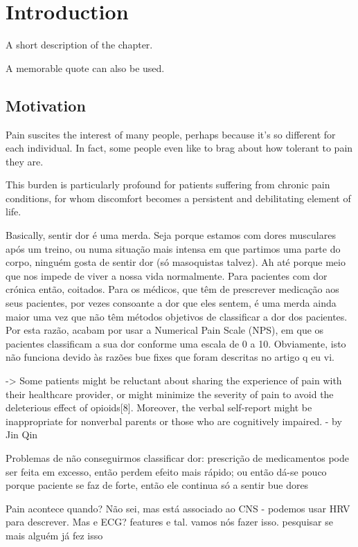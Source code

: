 \chapter{Introduction}%
\label{chapter:introduction}

\begin{introduction}
A short description of the chapter.

A memorable quote can also be used.
\end{introduction}


\section{Motivation}
Pain suscites the interest of many people, perhaps because it's so different for each individual. In fact, some people even like to brag about how tolerant to pain they are. 

This burden is particularly profound for patients suffering from chronic pain conditions, for whom discomfort becomes a persistent and debilitating element of life.

Basically, sentir dor é uma merda. Seja porque estamos com dores musculares após um treino, ou numa situação mais intensa em que partimos uma parte do corpo, ninguém gosta de sentir dor (só masoquistas talvez). Ah até porque meio que nos impede de viver a nossa vida normalmente. Para pacientes com dor crónica então, coitados. Para os médicos, que têm de prescrever medicação aos seus pacientes, por vezes consoante a dor que eles sentem, é uma merda ainda maior uma vez que não têm métodos objetivos de classificar a dor dos pacientes. Por esta razão, acabam por usar a Numerical Pain Scale (NPS), em que os pacientes classificam a sua dor conforme uma escala de 0 a 10. Obviamente, isto não funciona devido às razões bue fixes que foram descritas no artigo q eu vi.

-> Some patients might be reluctant about sharing the experience of pain with their healthcare provider, or might minimize the severity of pain to avoid the deleterious effect of opioids[8]. Moreover, the verbal self-report might be inappropriate for nonverbal parents or those who are cognitively impaired. - by Jin Qin

Problemas de não conseguirmos classificar dor: prescrição de medicamentos pode ser feita em excesso, então perdem efeito mais rápido; ou então dá-se pouco porque paciente se faz de forte, então ele continua só a sentir bue dores

Pain acontece quando? Não sei, mas está associado ao CNS - podemos usar HRV para descrever. Mas e ECG? features e tal. vamos nós fazer isso. pesquisar se mais alguém já fez isso


